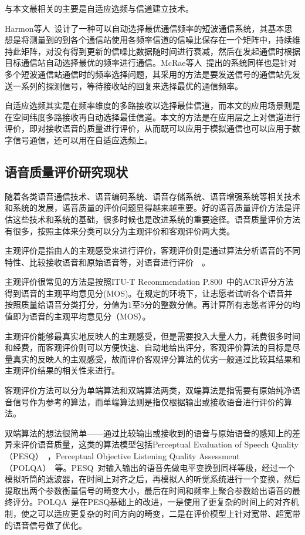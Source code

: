 与本文最相关的主要是自适应选频与信道建立技术。

Harmon等人~\cite{harmon1982adaptive}设计了一种可以自动选择最优通信频率的短波通信系统，其基本思想是将测量到的到各个通信站使用各频率信道的信噪比保存在一个矩阵中，持续维持此矩阵，对没有得到更新的信噪比数据随时间进行衰减，然后在发起通信时根据目标通信站自动选择最优的频率进行通信。McRae等人~\cite{mcrae1989frequency}提出的系统同样也是针对多个短波通信站通信时的频率选择问题，其采用的方法是要发送信号的通信站先发送一系列的探测信号，等待接收站的回复来选择最优的通信频率。

自适应选频其实是在频率维度的多路接收以选择最佳信道，而本文的应用场景则是在空间纬度多路接收再自动选择最佳信道。本文的方法是在应用层之上对信道进行评价，即对接收语音的质量进行评价，从而既可以应用于模拟通信也可以应用于数字信号通信，还可以用在自适应选频上。

\subsection{语音质量评价研究现状}

随着各类语音通信技术、语音编码系统、语音存储系统、语音增强系统等相关技术和系统的发展，语音质量的评价问题显得越来越重要。好的语音质量评价方法是评估这些技术和系统的基础，很多时候也是改进系统的重要途径。语音质量评价方法有很多，按照主体来分类可以分为主观评价和客观评价两大类。

主观评价是指由人的主观感受来进行评价，客观评价则是通过算法分析语音的不同特性、比较接收语音和原始语音等，对语音进行评价~\cite{肖累累2013语音质量客观评价方法的研究}~\cite{moller2011speech}。

主观评价很常见的方法是按照ITU-T Recommendation P.800~\cite{rec1996p}中的ACR评分方法得到语音的主观平均意见分(MOS)。在规定的环境下，让志愿者试听各个语音并按照质量给语音分类打分，分值为1至5分的整数分值。再计算所有志愿者评分的均值即为语音的主观平均意见分（MOS）。

主观评价能够最真实地反映人的主观感受，但是需要投入大量人力，耗费很多时间和经费，而客观评价则可以方便快速、自动地给出评分，客观评价算法的目标是尽量真实的反映人的主观感受，故而评价客观评分算法的优劣一般通过比较其结果和主观评价结果的相关性来进行。

客观评价方法可以分为单端算法和双端算法两类，双端算法是指需要有原始纯净语音信号作为参考的算法，而单端算法则是指仅根据输出或接收语音进行评价的算法。

双端算法的想法很简单——通过比较输出或接收到的语音与原始语音的感知上的差异来评价语音质量，这类的算法模型包括Perceptual Evaluation of Speech Quality（PESQ）~\cite{recommendation2001perceptual}，Perceptual Objective Listening Quality Assessment（POLQA）~\cite{rec2011p}等。PESQ~\cite{recommendation2001perceptual}对输入输出的语音先做电平变换到同样等级，经过一个模拟听筒的滤波器，在时间上对齐之后，再模拟人的听觉系统进行一个变换，然后提取出两个参数衡量信号的畸变大小，最后在时间和频率上聚合参数给出语音的最终评分。POLQA~\cite{rec2011p}是在PESQ基础上的改进，一是使用了更复杂的时间上的对齐机制，使之可以适应更复杂的时间方向的畸变，二是在评价模型上针对宽带、超宽带的语音信号做了优化。

